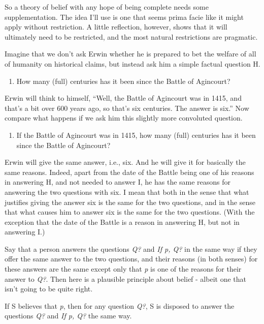 \documentclass[
  11pt,
]{book}
\providecommand{\tightlist}{%
  \setlength{\itemsep}{0pt}\setlength{\parskip}{0pt}}
\begin{document}
So a theory of belief with any hope of being complete needs some supplementation. The idea I'll use is one that seems prima facie like it might apply without restriction. A little reflection, however, shows that it will ultimately need to be restricted, and the most natural restrictions are pragmatic.

Imagine that we don't ask Erwin whether he is prepared to bet the welfare of all of humanity on historical claims, but instead ask him a simple factual question H.

\begin{enumerate}
\def\labelenumi{\Alph{enumi}.}
\setcounter{enumi}{7}
\tightlist
\item
  How many (full) centuries has it been since the Battle of Agincourt?
\end{enumerate}

Erwin will think to himself, ``Well, the Battle of Agincourt was in 1415, and that's a bit over 600 years ago, so that's six centuries. The answer is six.'' Now compare what happens if we ask him this slightly more convoluted question.

\begin{enumerate}
\def\labelenumi{\Roman{enumi}.}
\tightlist
\item
  If the Battle of Agincourt was in 1415, how many (full) centuries has it been since the Battle of Agincourt?
\end{enumerate}

Erwin will give the same answer, i.e., six. And he will give it for basically the same reasons. Indeed, apart from the date of the Battle being one of his reasons in answering H, and not needed to answer I, he has the same reasons for answering the two questions with six. I mean that both in the sense that what justifies giving the answer six is the same for the two questions, and in the sense that what causes him to answer six is the same for the two questions. (With the exception that the date of the Battle is a reason in answering H, but not in answering I.)

Say that a person answers the questions \emph{Q?} and \emph{If p, Q?} in the same way if they offer the same answer to the two questions, and their reasons (in both senses) for these answers are the same except only that \emph{p} is one of the reasons for their answer to \emph{Q?}. Then here is a plausible principle about belief - albeit one that isn't going to be quite right.

\begin{description}
\tightlist
\item[Unrestricted Conditional Questions]
If S believes that \emph{p}, then for any question \emph{Q?}, S is disposed to answer the questions \emph{Q?} and \emph{If p, Q?} the same way.
\end{description}
\end{document}
